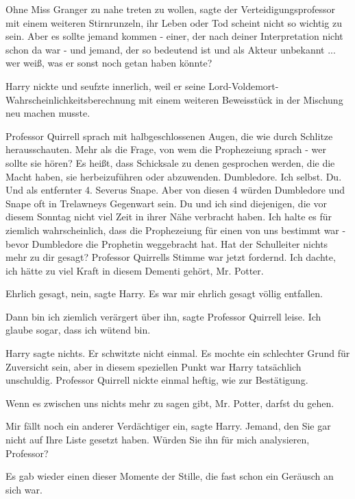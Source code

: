 \glqq Ohne Miss Granger zu nahe treten zu wollen\grqq{}, sagte der
Verteidigungsprofessor mit einem weiteren Stirnrunzeln, \glqq ihr Leben oder Tod
scheint nicht so wichtig zu sein. Aber es sollte jemand kommen - einer, der nach
deiner Interpretation nicht schon da war - und jemand, der so bedeutend ist und
als Akteur unbekannt ... wer weiß, was er sonst noch getan haben könnte?\grqq{}

Harry nickte und seufzte innerlich, weil er seine
Lord-Voldemort-Wahrscheinlichkeitsberechnung mit einem weiteren Beweisstück in
der Mischung neu machen musste.

Professor Quirrell sprach mit halbgeschlossenen Augen, die wie durch Schlitze
herausschauten. \glqq Mehr als die Frage, von wem die Prophezeiung sprach - wer
sollte sie hören? Es heißt, dass Schicksale zu denen gesprochen werden, die die
Macht haben, sie herbeizuführen oder abzuwenden. Dumbledore. Ich selbst. Du. Und
als entfernter 4. Severus Snape. Aber von diesen 4 würden Dumbledore und Snape
oft in Trelawneys Gegenwart sein. Du und ich sind diejenigen, die vor diesem
Sonntag nicht viel Zeit in ihrer Nähe verbracht haben. Ich halte es für ziemlich
wahrscheinlich, dass die Prophezeiung für einen von uns bestimmt war - bevor
Dumbledore die Prophetin weggebracht hat. Hat der Schulleiter nichts mehr zu dir
gesagt?\grqq{} Professor Quirrells Stimme war jetzt fordernd. \glqq Ich dachte,
ich hätte zu viel Kraft in diesem Dementi gehört, Mr. Potter.\grqq{}

\glqq Ehrlich gesagt, nein\grqq{}, sagte Harry. \glqq Es war mir ehrlich gesagt
völlig entfallen.\grqq{}

\glqq Dann bin ich ziemlich verärgert über ihn\grqq{}, sagte Professor Quirrell
leise. \glqq Ich glaube sogar, dass ich wütend bin.\grqq{}

Harry sagte nichts. Er schwitzte nicht einmal. Es mochte ein schlechter Grund
für Zuversicht sein, aber in diesem speziellen Punkt war Harry tatsächlich
unschuldig. Professor Quirrell nickte einmal heftig, wie zur Bestätigung.

\glqq Wenn es zwischen uns nichts mehr zu sagen gibt, Mr. Potter, darfst du
gehen.\grqq{}

\glqq Mir fällt noch ein anderer Verdächtiger ein\grqq{}, sagte Harry. \glqq
Jemand, den Sie gar nicht auf Ihre Liste gesetzt haben. Würden Sie ihn für mich
analysieren, Professor?\grqq{}

Es gab wieder einen dieser Momente der Stille, die fast schon ein Geräusch an
sich war.

